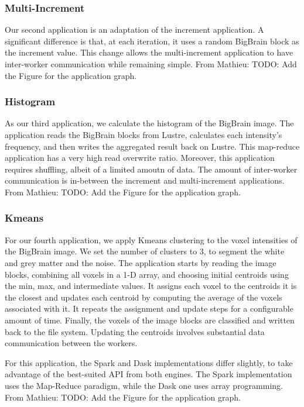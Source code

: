 \documentclass[conference]{IEEEtran}
\newcommand{\MD}[1]{\color{magenta}From Mathieu: #1 \color{black}}
\begin{document}
\subsubsection{Multi-Increment}
Our second application is an adaptation of the increment application.
A significant difference is that, at each iteration, it uses a random BigBrain block as the increment value. 
This change allows the multi-increment application to have inter-worker communication while remaining simple.
\MD{TODO: Add the Figure for the application graph.}
	
\subsubsection{Histogram}
As our third application, we calculate the histogram of the BigBrain image. 
The application reads the BigBrain blocks from Lustre, calculates each intensity's frequency, and then writes the aggregated result back on Lustre.
This map-reduce application has a very high read overwrite ratio.
Moreover, this application requires shuffling, albeit of a limited amoutn of data. 
The amount of inter-worker communication is in-between the increment and multi-increment applications.
\MD{TODO: Add the Figure for the application graph.}
	
\subsubsection{Kmeans} %
For our fourth application, we apply Kmeans clustering to the voxel intensities of the BigBrain image.
We set the number of clusters to 3, to segment the white and grey matter and the noise.
The application starts by reading the image blocks, combining all voxels in a 1-D array, and choosing initial centroids using the min, max, and intermediate values.
It assigns each voxel to the centroids it is the closest and updates each centroid by computing the average of the voxels associated with it. 
It repeats the assignment and update steps for a configurable amount of time. 
Finally, the voxels of the image blocks are classified and written back to the file system.
Updating the centroids involves substantial data communication between the workers.

For this application, the Spark and Dask implementations differ slightly,  to take advantage of the best-suited API from both engines.
The Spark implementation uses the Map-Reduce paradigm, while the Dask one uses array programming.
\MD{TODO: Add the Figure for the application graph.}
	
\end{document}
